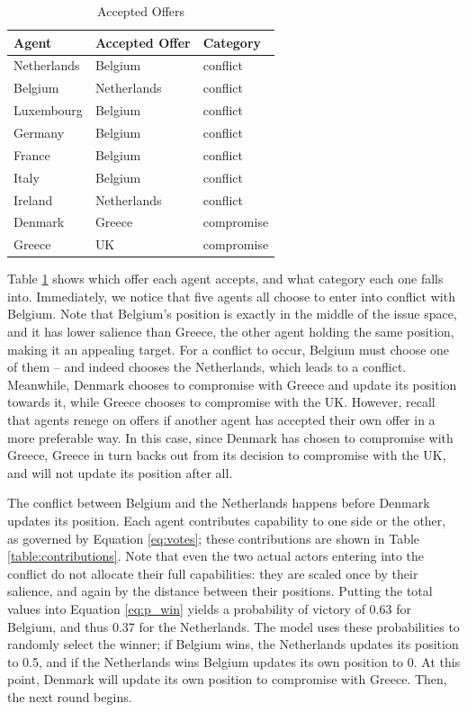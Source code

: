 \begin{table}
\centering
    \caption{Accepted Offers}
    \label{eg_offers}
\begin{tabular}{lll}
    \hline
    Agent &  Accepted Offer & Category \\
    \hline
    Netherlands & Belgium & conflict \\
    Belgium & Netherlands & conflict \\
    Luxembourg & Belgium & conflict \\
    Germany & Belgium & conflict \\
    France & Belgium & conflict \\
    Italy & Belgium & conflict \\
    Ireland & Netherlands & conflict \\
    Denmark & Greece & compromise \\
    Greece & UK & compromise \\
    \hline
\end{tabular}
\tableSpace

\end{table}

Table \ref{eg_offers} shows which offer each agent accepts, and what category each one falls into. Immediately, we notice that five agents all choose to enter into conflict with Belgium. Note that Belgium's position is exactly in the middle of the issue space, and it has lower salience than Greece, the other agent holding the same position, making it an appealing target. For a conflict to occur, Belgium must choose one of them -- and indeed chooses the Netherlands, which leads to a conflict. Meanwhile, Denmark chooses to compromise with Greece and update its position towards it, while Greece chooses to compromise with the UK. However, recall that agents renege on offers if another agent has accepted their own offer in a more preferable way. In this case, since Denmark has chosen to compromise with Greece, Greece in turn backs out from its decision to compromise with the UK, and will not update its position after all.

The conflict between Belgium and the Netherlands happens before Denmark updates its position. Each agent contributes capability to one side or the other, as governed by Equation \ref{eq:votes}; these contributions are shown in Table \ref{table:contributions}. Note that even the two actual actors entering into the conflict do not allocate their full capabilities: they are scaled once by their salience, and again by the distance between their positions. Putting the total values into Equation \ref{eq:p_win} yields a probability of victory of 0.63 for Belgium, and thus 0.37 for the Netherlands. The model uses these probabilities to randomly select the winner; if Belgium wins, the Netherlands updates its position to 0.5, and if the Netherlands wins Belgium updates its own position to 0. At this point, Denmark will update its own position to compromise with Greece. Then, the next round begins.

